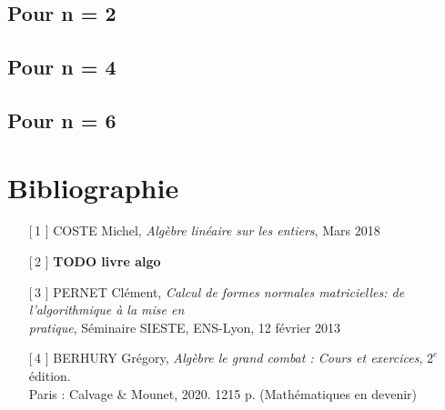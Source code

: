 \documentclass[12pt]{article}
\begin{document}
\subsection{Pour n = 2}
\subsection{Pour n = 4}
\subsection{Pour n = 6}

\newpage
\section{Bibliographie}
\begin{enumerate}

	\item[[\,1\!\!]] COSTE Michel, \textit{Algèbre linéaire sur les entiers}, Mars 2018
	\item[[\,2\!\!]] \textbf{TODO livre algo}
	\item[[\,3\!\!]] PERNET Clément, \textit{Calcul de formes normales matricielles: de
		      l'algorithmique à la mise en \\pratique}, Séminaire SIESTE, ENS-Lyon, 12 février 2013
	\item[[\,4\!\!]] BERHURY Grégory, \textit{Algèbre le grand combat : Cours et exercices},
	      $2^e$ édition.\\
	      Paris : Calvage \& Mounet, 2020. 1215 p. (Mathématiques en devenir)
\end{enumerate}
\end{document}
